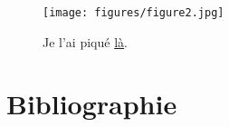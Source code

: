 \documentclass{config}
\begin{document}
\begin{figure}[H]
  \centering
  \vspace{0mm}
  \texttt{[image: figures/figure2.jpg]}
  \vspace{-2mm}
  \caption{Je l'ai piqué \href{https://saam.inrae.fr/}{là}.}
  \label{fig:figure2}
  \vspace{-1mm}
\end{figure}

\lipsum[7-8] 


\newpage
{
\label{page:fiche}
\thiswatermark{}
\pagestyle{empty}

}


\newpage
\section{Bibliographie}
\vspace{-0.9cm}



\end{document}
